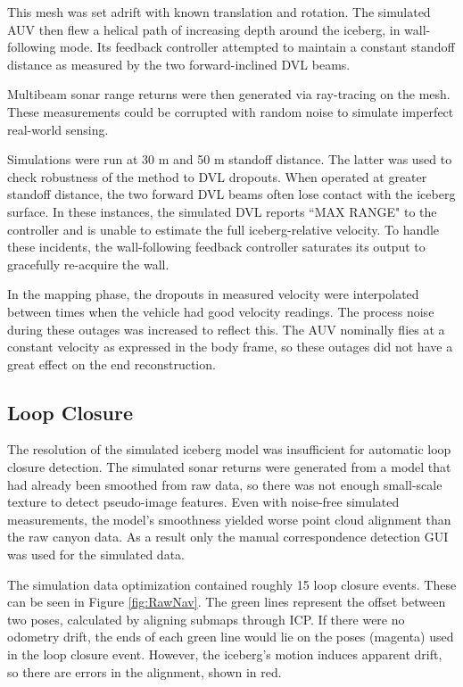 This mesh was set adrift with known translation and rotation. The simulated AUV then flew a helical path of increasing depth around the iceberg, in wall-following mode. Its feedback controller attempted to maintain a constant standoff distance as measured by the two forward-inclined DVL beams.

Multibeam sonar range returns were then generated via ray-tracing on the mesh. These measurements could be corrupted with random noise to simulate imperfect real-world sensing. 

Simulations were run at 30 m and 50 m standoff distance. The latter was used to check robustness of the method to DVL dropouts. When operated at greater standoff distance, the two forward DVL beams often lose contact with the iceberg surface. In these instances, the simulated DVL reports ``MAX RANGE" to the controller and is unable to estimate the full iceberg-relative velocity. To handle these incidents, the wall-following feedback controller saturates its output to gracefully re-acquire the wall. 

In the mapping phase, the dropouts in measured velocity were interpolated between times when the vehicle had good velocity readings. The process noise during these outages was increased to reflect this. The AUV nominally flies at a constant velocity as expressed in the body frame, so these outages did not have a great effect on the end reconstruction.

\subsection{Loop Closure}

The resolution of the simulated iceberg model was insufficient for automatic loop closure detection. The simulated sonar returns were generated from a model that had already been smoothed from raw data, so there was not enough small-scale texture to detect pseudo-image features. Even with noise-free simulated measurements, the model's smoothness yielded worse point cloud alignment than the raw canyon data. As a result only the manual correspondence detection GUI was used for the simulated data. 

The simulation data optimization contained roughly 15 loop closure events. These can be seen in Figure \ref{fig:RawNav}. The green lines represent the offset between two poses, calculated by aligning submaps through ICP. If there were no odometry drift, the ends of each green line would lie on the poses (magenta) used in the loop closure event. However, the iceberg's motion induces apparent drift, so there are errors in the alignment, shown in red.


